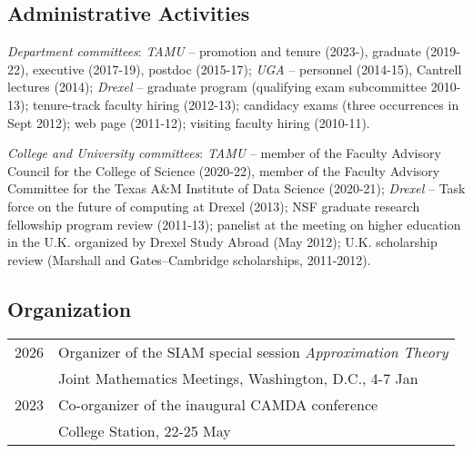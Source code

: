 \documentclass[11pt]{article}
\begin{document}
\subsection{Administrative Activities}
\bitemize
\item {\sl Department committees}:  
{\sl TAMU} -- promotion and tenure (2023-), 
graduate (2019-22), executive (2017-19), postdoc (2015-17);
{\sl UGA} -- personnel (2014-15), Cantrell lectures (2014); 
{\sl Drexel} -- 
graduate program (qualifying exam subcommittee 2010-13);
tenure-track faculty hiring (2012-13); 
candidacy exams (three occurrences in Sept 2012);
web page (2011-12);
visiting faculty hiring (2010-11).
\item {\sl College and University committees}: 
{\sl TAMU} -- 
member of the Faculty Advisory Council for the College of Science (2020-22),
member of the Faculty Advisory Committee for the Texas A\&M Institute of Data Science (2020-21);
{\sl Drexel} -- 
Task force on the future of computing at Drexel (2013);
NSF graduate research fellowship program review (2011-13);
panelist at the meeting on higher education in the U.K. organized by Drexel Study Abroad (May 2012); 
U.K. scholarship review  (Marshall and Gates--Cambridge scholarships, 2011-2012).
\eitemize 
 

\subsection{Organization}

\begin{tabular}{ll}
2026\phantom{-??} & Organizer of the SIAM special session {\em Approximation Theory}\\
& Joint Mathematics Meetings, Washington, D.C., 4-7 Jan\\
2023 & Co-organizer of the inaugural CAMDA conference\\
& College Station, 22-25 May
\end{tabular}
\end{document}
